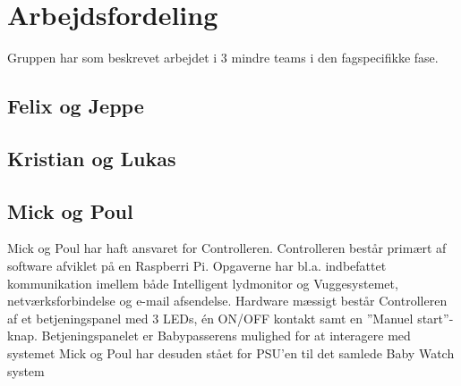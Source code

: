  \section{Arbejdsfordeling}

Gruppen har som beskrevet arbejdet i 3 mindre teams i den fagspecifikke fase. 

\subsection*{Felix og Jeppe}


\subsection*{Kristian og Lukas}


\subsection*{Mick og Poul}
Mick og Poul har haft ansvaret for Controlleren. Controlleren består primært af software afviklet på en Raspberri Pi. Opgaverne har bl.a. indbefattet kommunikation imellem både Intelligent lydmonitor og Vuggesystemet, netværksforbindelse og e-mail afsendelse. 
Hardware mæssigt består Controlleren af et betjeningspanel med 3 LEDs, én ON/OFF kontakt samt en ''Manuel start''-knap. Betjeningspanelet er Babypasserens mulighed for at interagere med systemet
Mick og Poul har desuden stået for PSU'en til det samlede Baby Watch system


